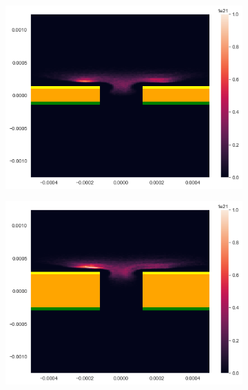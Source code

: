 \begin{figure}[h!]
    \centering
    \begin{subfigure}[b]{0.475\textwidth}
        \centering
        \includegraphics[width=\textwidth]{chapter_4/figures/SRR_dielectric_1.png}
        \caption{}  
        \label{fig:SRR_dielectric_0.2mm}
    \end{subfigure}
    \hfill
    \begin{subfigure}[b]{0.475\textwidth}  
        \centering 
        \includegraphics[width=\textwidth]{chapter_4/figures/SRR_dielectric_2.png}
        \caption{}   
        \label{fig:SRR_dielectric_0.5mm}
    \end{subfigure}

\end{figure}
